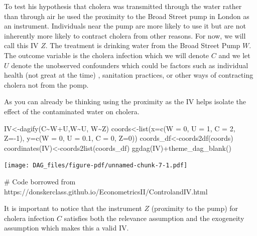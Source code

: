 \documentclass[
  letterpaper,
  DIV=11,
  numbers=noendperiod]{scrreprt}
\newenvironment{Shaded}{\begin{snugshade}}{\end{snugshade}}
\newcommand{\AttributeTok}[1]{\textcolor[rgb]{0.40,0.45,0.13}{#1}}
\newcommand{\CommentTok}[1]{\textcolor[rgb]{0.37,0.37,0.37}{#1}}
\newcommand{\DecValTok}[1]{\textcolor[rgb]{0.68,0.00,0.00}{#1}}
\newcommand{\FloatTok}[1]{\textcolor[rgb]{0.68,0.00,0.00}{#1}}
\newcommand{\FunctionTok}[1]{\textcolor[rgb]{0.28,0.35,0.67}{#1}}
\newcommand{\NormalTok}[1]{\textcolor[rgb]{0.00,0.23,0.31}{#1}}
\newcommand{\OtherTok}[1]{\textcolor[rgb]{0.00,0.23,0.31}{#1}}
\newcommand{\SpecialCharTok}[1]{\textcolor[rgb]{0.37,0.37,0.37}{#1}}
\theoremstyle{definition}
\theoremstyle{remark}
\begin{document}
To test his hypothesis that cholera was transmitted through the water
rather than through air he used the proximity to the Broad Street pump
in London as an instrument. Individuals near the pump are more likely to
use it but are not inherently more likely to contract cholera from other
reasons. For now, we will call this IV \(Z\). The treatment is drinking
water from the Broad Street Pump \(W\). The outcome variable is the
cholera infection which we will denote \(C\) and we let \(U\) denote the
unobserved confounders which could be factors such as individual health
(not great at the time) , sanitation practices, or other ways of
contracting cholera not from the pomp.

As you can already be thinking using the proximity as the IV helps
isolate the effect of the contaminated water on cholera.

\begin{Shaded}
\begin{Highlighting}[]
\NormalTok{IV}\OtherTok{\textless{}{-}}\FunctionTok{dagify}\NormalTok{(C}\SpecialCharTok{\textasciitilde{}}\NormalTok{W}\SpecialCharTok{+}\NormalTok{U,W}\SpecialCharTok{\textasciitilde{}}\NormalTok{U, W}\SpecialCharTok{\textasciitilde{}}\NormalTok{Z) }
\NormalTok{coords}\OtherTok{\textless{}{-}}\FunctionTok{list}\NormalTok{(}\AttributeTok{x=}\FunctionTok{c}\NormalTok{(}\AttributeTok{W =} \DecValTok{0}\NormalTok{, }\AttributeTok{U =} \DecValTok{1}\NormalTok{, }\AttributeTok{C =} \DecValTok{2}\NormalTok{, }\AttributeTok{Z=}\SpecialCharTok{{-}}\DecValTok{1}\NormalTok{),}
          \AttributeTok{y=}\FunctionTok{c}\NormalTok{(}\AttributeTok{W =} \DecValTok{0}\NormalTok{, }\AttributeTok{U =} \FloatTok{0.1}\NormalTok{, }\AttributeTok{C =} \DecValTok{0}\NormalTok{, }\AttributeTok{Z=}\DecValTok{0}\NormalTok{)) }
\NormalTok{coords\_df}\OtherTok{\textless{}{-}}\FunctionTok{coords2df}\NormalTok{(coords)}
\FunctionTok{coordinates}\NormalTok{(IV)}\OtherTok{\textless{}{-}}\FunctionTok{coords2list}\NormalTok{(coords\_df)}
\FunctionTok{ggdag}\NormalTok{(IV)}\SpecialCharTok{+}\FunctionTok{theme\_dag\_blank}\NormalTok{()}
\end{Highlighting}
\end{Shaded}

\texttt{[image: DAG\_files/figure-pdf/unnamed-chunk-7-1.pdf]}

\begin{Shaded}
\begin{Highlighting}[]
\CommentTok{\# Code borrowed from https://donskerclass.github.io/EconometricsII/ControlandIV.html}
\end{Highlighting}
\end{Shaded}

It is important to notice that the instrument \(Z\) (proximity to the
pump) for cholera infection \(C\) satisfies both the relevance
assumption and the exogeneity assumption which makes this a valid IV.
\end{document}
